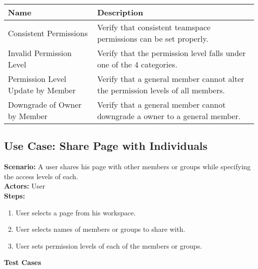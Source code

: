 \documentclass{article}
\begin{document}
            \begin{longtable}{|p{}|p{}|}
            \hline
            \textbf{Name} & \textbf{Description} \\
            \hline
            Consistent Permissions & Verify that consistent teamspace permissions can be set properly. \\
\hline
Invalid Permission Level & Verify that the permission level falls under one of the 4 categories. \\
\hline
Permission Level Update by Member & Verify that a general member cannot alter the permission levels of all members. \\
\hline
Downgrade of Owner by Member & Verify that a general member cannot downgrade a owner to a general member. \\
\hline
\end{longtable}\subsection{\textbf{Use Case: Share Page with Individuals}}
\textbf{Scenario:} A user shares his page with other members or groups while specifying the access levels of each.\\
\textbf{Actors:} User\\
\textbf{Steps:}
\begin{enumerate}
\item User selects a page from his workspace.
\item User selects names of members or groups to share with.
\item User sets permission levels of each of the members or groups.
\end{enumerate}
\textbf{Test Cases}
\end{document}
